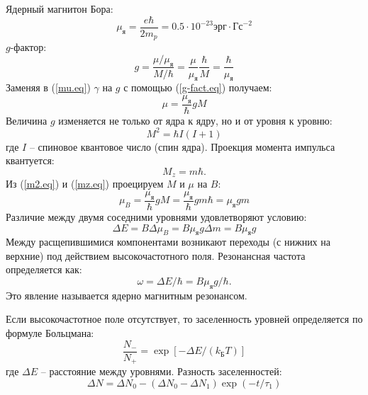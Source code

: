\documentclass[a4paper, 12pt]{article}
\begin{document}
	Ядерный магнитон Бора:
	\begin{equation}
		\mu_{\text{я}}=\frac{e\hbar}{2m_p}=0.5\cdot 10^{-23} \text{эрг}\cdot\text{Гс}^{-2}
		\label{mu_core.eq}
	\end{equation}
	$g$-фактор:
	\begin{equation}
		g=\frac{\mu/\mu_{\text{я}}}{M/\hbar}=\frac{\mu}{\mu_{\text{я}}}\frac{\hbar}{M}=\frac{\hbar}{\mu_{\text{я}}}
		\label{g-fact.eq}
	\end{equation}
	Заменяя в (\ref{mu.eq}) $\gamma$ на $g$  с помощью (\ref{g-fact.eq}) получаем:
	\begin{equation}
		\mu=\frac{\mu_{\text{я}}}{\hbar}gM
		\label{new_mu.eq}
	\end{equation} 
	Величина $g$ изменяется не только от ядра к ядру, но и от уровня к уровню:
	\begin{equation}
		M^2=\hbar I(I+1)
		\label{m2.eq}
	\end{equation}
	где $I$ -- спиновое квантовое число (спин ядра). Проекция момента импульса квантуется:
	\begin{equation}
		M_z=m\hbar.
		\label{mz.eq}
	\end{equation}
	Из (\ref{m2.eq}) и (\ref{mz.eq}) проецируем $M$ и $\mu$ на $B$:
	\begin{equation}
		\mu_B=\frac{\mu_{\text{я}}}{\hbar}gM=\frac{\mu_{\text{я}}}{\hbar}gm\hbar=\mu_{\text{я}}gm
		\label{mub.eq}
	\end{equation}
	Различие между двумя соседними уровнями удовлетворяют условию:
	\begin{equation}
		\Delta E=B\Delta\mu_B=B\mu_{\text{я}}g\Delta m=B\mu_{\text{я}}g
		\label{deltae.eq}
	\end{equation}
	Между расщепившимися компонентами возникают переходы (с нижних на верхние) под действием высокочастотного поля. Резонансная частота определяется как:
	\begin{equation}
		\omega=\Delta E/\hbar=B\mu_{\text{я}}g/\hbar.
	\end{equation}
	Это явление называется ядерно магнитным резонансом.

	Если высокочастотное поле отсутствует, то заселенность уровней определяется по формуле Больцмана:
	\begin{equation}
		\frac{N_-}{N_+}=\exp{\left[-\Delta E/(k_{\text{Б}}T)\right]}
	\end{equation}
	где $\Delta E$ -- расстояние между уровнями. Разность заселенностей:
	\begin{equation}
		\Delta N=\Delta N_0-\left(\Delta N_0-\Delta N_1\right)\exp{\left(-t/\tau_1\right)}
	\end{equation}
\end{document}
